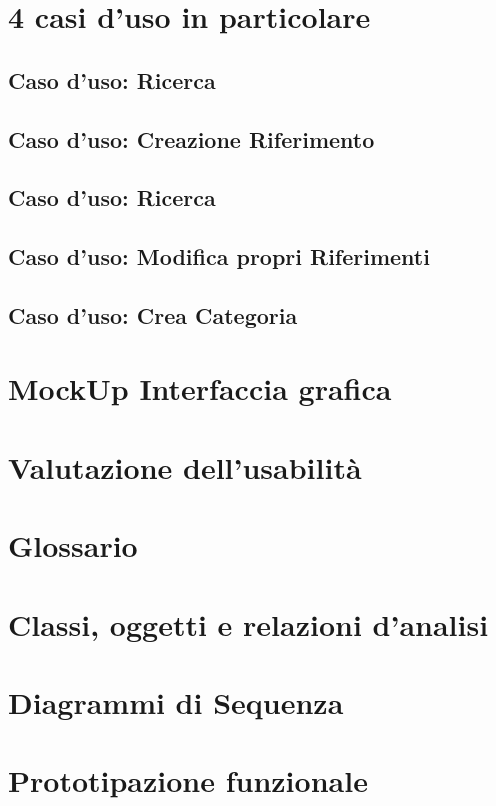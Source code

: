 \raggedright{\section{4 casi d'uso in particolare}}
\raggedright{\subsection{Caso d'uso: Ricerca}}
\raggedright{\subsection{Caso d'uso: Creazione Riferimento}}
\raggedright{\subsection{Caso d'uso: Ricerca}}
\raggedright{\subsection{Caso d'uso: Modifica propri Riferimenti}}
\raggedright{\subsection{Caso d'uso: Crea Categoria}}






\raggedright{\section{MockUp Interfaccia grafica}}

\raggedright{\section{Valutazione dell'usabilità}}

\raggedright{\section{Glossario}}

\raggedright{\section{Classi, oggetti e relazioni d'analisi}}

\raggedright{\section{Diagrammi di Sequenza}}

\raggedright{\section{Prototipazione funzionale}}









